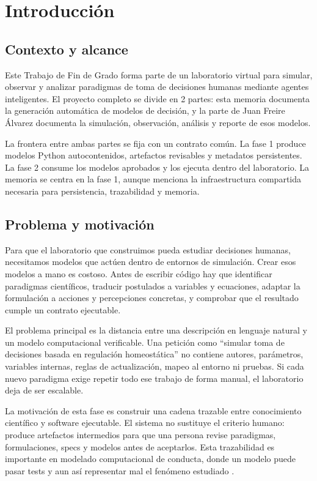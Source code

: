 \chapter{Introducción}

\section{Contexto y alcance}

Este Trabajo de Fin de Grado forma parte de un laboratorio virtual para
simular, observar y analizar paradigmas de toma de decisiones humanas mediante
agentes inteligentes. El proyecto completo se divide en 2 partes: esta memoria
documenta la generación automática de modelos de decisión, y la parte de Juan
Freire Álvarez documenta la simulación, observación, análisis y reporte de esos
modelos.

La frontera entre ambas partes se fija con un contrato común. La fase 1 produce
modelos Python autocontenidos, artefactos revisables y metadatos persistentes.
La fase 2 consume los modelos aprobados y los ejecuta dentro del laboratorio. La
memoria se centra en la fase 1, aunque menciona la infraestructura compartida
necesaria para persistencia, trazabilidad y memoria.

\section{Problema y motivación}

Para que el laboratorio que construimos pueda estudiar decisiones humanas,
necesitamos modelos que actúen dentro de entornos de simulación. Crear esos
modelos a mano es costoso. Antes de escribir código hay que identificar
paradigmas científicos, traducir postulados a variables y ecuaciones, adaptar
la formulación a acciones y percepciones concretas, y comprobar que el resultado
cumple un contrato ejecutable.

El problema principal es la distancia entre una descripción en lenguaje natural
y un modelo computacional verificable. Una petición como ``simular toma de
decisiones basada en regulación homeostática'' no contiene autores,
parámetros, variables internas, reglas de actualización, mapeo al entorno ni
pruebas. Si cada nuevo paradigma exige repetir todo ese trabajo de forma manual,
el laboratorio deja de ser escalable.

La motivación de esta fase es construir una cadena trazable entre conocimiento
científico y software ejecutable. El sistema no sustituye el criterio humano:
produce artefactos intermedios para que una persona revise paradigmas,
formulaciones, specs y modelos antes de aceptarlos. Esta trazabilidad es
importante en modelado computacional de conducta, donde un modelo puede pasar
tests y aun así representar mal el fenómeno estudiado \cite{wilson2019modeling}.

